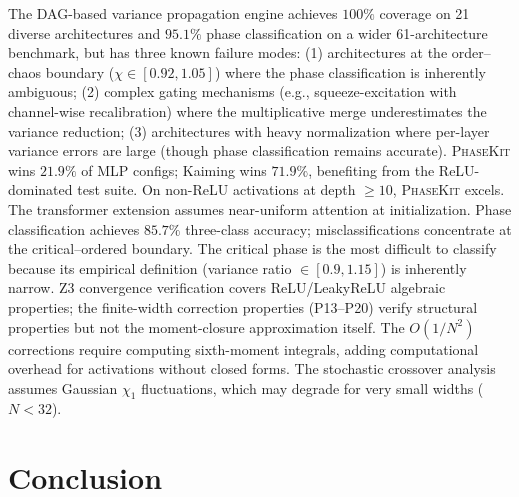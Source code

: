 \documentclass[10pt]{article}
\newcommand{\ToolName}{\textsc{PhaseKit}}
\begin{document}
The DAG-based variance propagation engine achieves $100\%$ coverage on 21 diverse architectures and $95.1\%$ phase classification on a wider 61-architecture benchmark, but has three known failure modes: (1) architectures at the order--chaos boundary ($\chi \in [0.92, 1.05]$) where the phase classification is inherently ambiguous; (2) complex gating mechanisms (e.g., squeeze-excitation with channel-wise recalibration) where the multiplicative merge underestimates the variance reduction; (3) architectures with heavy normalization where per-layer variance errors are large (though phase classification remains accurate).
\ToolName{} wins $21.9\%$ of MLP configs; Kaiming wins $71.9\%$, benefiting from the ReLU-dominated test suite.
On non-ReLU activations at depth $\geq 10$, \ToolName{} excels.
The transformer extension assumes near-uniform attention at initialization.
Phase classification achieves $85.7\%$ three-class accuracy; misclassifications concentrate at the critical--ordered boundary.
The critical phase is the most difficult to classify because its empirical definition (variance ratio $\in [0.9, 1.15]$) is inherently narrow.
Z3 convergence verification covers ReLU/LeakyReLU algebraic properties; the finite-width correction properties (P13--P20) verify structural properties but not the moment-closure approximation itself.
The $O(1/N^2)$ corrections require computing sixth-moment integrals, adding computational overhead for activations without closed forms.
The stochastic crossover analysis assumes Gaussian $\chi_1$ fluctuations, which may degrade for very small widths ($N < 32$).

\section{Conclusion}
\label{sec:conclusion}
\end{document}
